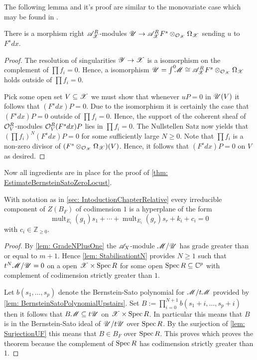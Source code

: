 The following lemma and it's proof are similar to the monovariate case which may be found in \cite[p246]{bjork1979rings}.
\begin{lemma}\label{lem: SurjectionUF}
  There is a morphism right $\mathscr{A}_{\mathscr{X}}^R$-modules $\mathscr{U}\to \mathscr{A}_{\mathscr{X}}^RF^s \otimes_{\mathcal{O}_{\mathscr{X}}}\Omega_{\mathscr{X}}$ sending $u$ to $F^sdx$.
\end{lemma}
\begin{proof}
   The resolution of singularities $\mathscr{Y}\to \mathscr{X}$ is a isomorphism on the complement of $\prod f_i = 0$. Hence, a isomorphism $\mathscr{U} = \int^0 \mkern -8mu \mathscr{M} \cong  \mathscr{A}_{\mathscr{X}}^RF^s  \otimes_{\mathcal{O}_{\mathscr{X}}}\Omega_{\mathscr{X}}$ holds outside of $\prod f_i = 0$.

  Pick some open set $V\subseteq \mathscr{X}$ we must show that whenever $uP = 0$ in $\mathscr{U}(V)$ it follows that $(F^s dx)P = 0$.
  Due to the isomorphism it is certainly the case that $(F^s dx) P = 0$ outside of $\prod f_i = 0$.
  Hence, the support of the coherent sheaf of $\mathcal{O}_V^R$-modules $\mathcal{O}_V^R (F^s dx) P $ lies in $\prod f_i = 0$.
  The Nullstellen Satz now yields that $(\prod f_i)^N (F^s dx) P  = 0$ for some sufficiently large $N\geq 0$.
  Note that $\prod f_i$ is a non-zero divisor of $(F^s\otimes_{\mathcal{O}_{\mathscr{X}}} \Omega_{\mathscr{X}})(V)$. Hence, it follows that $(F^s dx) P= 0$ on $V$ as desired.
\end{proof}
Now all ingredients are in place for the proof of \cref{thm: EstimateBernsteinSatoZeroLocust}.
\begin{theorem}
  With notation as in \cref{sec: IntoductionChapterRelative} every irreducible component of $Z(B_F)$ of codimension $1$ is a hyperplane of the form
  $$\operatorname{mult}_{E_i}(g_1) s_1 + \cdots + \operatorname{mult}_{E_i}(g_r)s_r + k_i + c_i=0$$
  with $c_i \in \mathbb{Z}_{\geq 0 }$.
\end{theorem}
\begin{proof}
  By \cref{lem: GradeNPlusOne} the $\mathscr{A}_X$-module $\mathscr{M}/\mathscr{U}$ has grade greater than or equal to $m + 1$. Hence \cref{lem: StabilisationtN} provides $N\geq 1$ such that $t^N\mathscr{M}/\mathscr{U} = 0$ on a open $\mathscr{X}\times\operatorname{Spec} R$ for some open $\operatorname{Spec} R\subseteq \mathbb{C}^p$ with complement of codimension strictly greater than $1$.

  Let $b(s_1,\ldots,s_p)$ denote the Bernstein-Sato polynomial for $\mathscr{M}/t\mathscr{M}$ provided by \cref{lem: BernsteinSatoPolynomialUpstairs}.
  Set $B := \prod_{i=0}^{N+1} b(s_1 + i, \ldots, s_p + i)$ then it follows that
  $B\mathscr{M} \subseteq t\mathscr{U}$ on $\mathscr{X} \times \operatorname{Spec} R$.
  In particular this means that $B$ is in the Bernstein-Sato ideal of $\mathscr{U}/t\mathscr{U}$ over $\operatorname{Spec} R$.
  By the surjection of \cref{lem: SurjectionUF} this means that $B\in B_F$ over $\operatorname{Spec} R$. This proves which proves the theorem because the complement of $\operatorname{Spec} R$ has codimension strictly greater than 1.
\end{proof}
